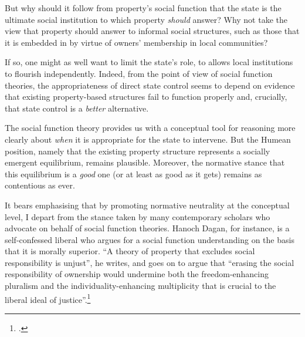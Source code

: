 {But why should it follow from property's social function that the state is the ultimate social institution to which property {\it should} answer? Why not take the view that property should answer to informal social structures, such as those that it is embedded in by virtue of owners' membership in local communities?

If so, one might as well want to limit the state's role, to allows local institutions to flourish independently. Indeed, from the point of view of social function theories, the appropriateness of direct state control seems to depend on evidence that existing property-based structures fail to function properly and, crucially, that state control is a {\it better} alternative.



The social function theory provides us with a conceptual tool for reasoning more clearly about {\it when} it is appropriate for the state to intervene. But the Humean position, namely that the existing property structure represents a socially emergent equilibrium, remains plausible. Moreover, the normative stance that this equilibrium is a {\it good} one (or at least as good as it gets) remains as contentious as ever.

It bears emphasising that by promoting normative neutrality at the conceptual level, I depart from the stance taken by many contemporary scholars who advocate on behalf of social function theories. Hanoch Dagan, for instance, is a self-confessed liberal who argues for a social function understanding on the basis that it is morally superior. ``A theory of property that excludes social responsibility is unjust'', he writes, and goes on to argue that ``erasing the social responsibility of ownership would undermine both the freedom-enhancing pluralism and the individuality-enhancing multiplicity that is crucial to the liberal ideal of justice''.\footcite[1259]{dagan07}

}
